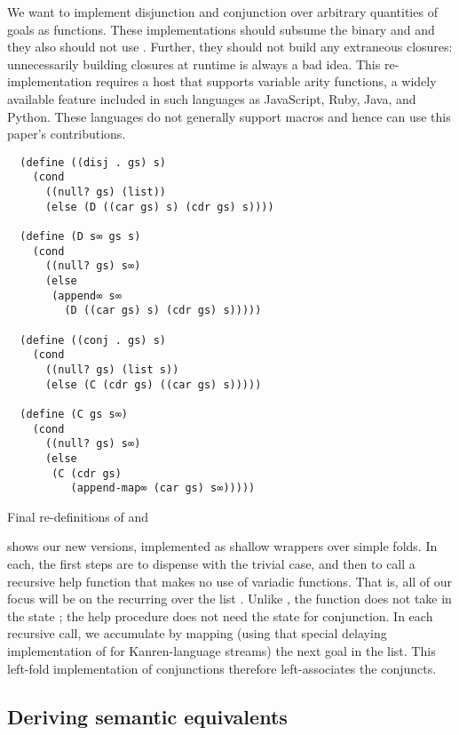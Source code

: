 \documentclass[sigplan,balance,pbalance,natbib=false]{acmart}
\begin{document}
We want to implement disjunction and conjunction over arbitrary
quantities of goals as functions. These implementations should
subsume the binary  and  and they
also should not use . Further, they should not build
any extraneous closures: unnecessarily building closures at runtime is
always a bad idea. This re-implementation requires a host that
supports variable arity functions, a widely available feature included
in such languages as JavaScript, Ruby, Java, and Python. These
languages do not generally support macros and hence can use this
paper's contributions.

\begin{listing}
\begin{verbatim}
  (define ((disj . gs) s)
    (cond
      ((null? gs) (list))
      (else (D ((car gs) s) (cdr gs) s))))

  (define (D s∞ gs s)
    (cond
      ((null? gs) s∞)
      (else
       (append∞ s∞
         (D ((car gs) s) (cdr gs) s)))))

  (define ((conj . gs) s)
    (cond
      ((null? gs) (list s))
      (else (C (cdr gs) ((car gs) s)))))

  (define (C gs s∞)
    (cond
      ((null? gs) s∞)
      (else
       (C (cdr gs)
          (append-map∞ (car gs) s∞)))))
\end{verbatim}
  \caption{Final re-definitions of  and }\label{mnt:disj-reimplementation}
\end{listing}

 shows our new versions, implemented
as shallow wrappers over simple folds. In each, the first steps are to
dispense with the trivial case, and then to call a recursive help
function that makes no use of variadic functions. That is, all of our
focus will be on the recurring over the list .
Unlike , the function  does not take in
the state ; the help procedure does not need the state
for conjunction. In each recursive call, we accumulate by mapping
(using that special delaying implementation
of  for Kanren-language streams) the next goal
in the list. This left-fold implementation of conjunctions therefore
left-associates the conjuncts.

\subsection{Deriving semantic equivalents}
\end{document}
